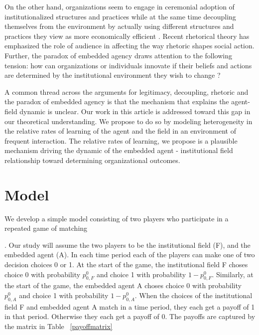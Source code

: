 \documentclass[12pt,letterpaper]{article}
\begin{document}
On the other hand, organizations seem to engage in ceremonial adoption of institutionalized structures and practices while at the same time decoupling themselves from the environment by actually using different structures and practices they view as more economically efficient \citep{Kostova2008}. Recent rhetorical theory has emphasized the role of audience in affecting the way rhetoric shapes social action. Further, the paradox of embedded agency draws attention  to the following tension: how can organizations or individuals innovate if their beliefs and actions are determined by the institutional environment they wish to change \citep{Scott1987}? 

A common thread across the arguments for legitimacy, decoupling, rhetoric and the paradox of embedded agency is that the mechanism that explains the agent-field dynamic is unclear. Our work in this article is addressed toward this gap in our  theoretical understanding. We propose to do so by modeling heterogeneity in the relative rates of learning  of the agent and the field in an environment of frequent interaction. The relative rates of learning, we propose is a plausible mechanism driving the dynamic of the embedded agent - institutional field relationship toward determining organizational outcomes.

\section{Model}

We develop a simple model consisting of two players who participate in a repeated game of matching . Our study will assume the two players to be the institutional field (F), and the embedded agent (A). In each time period each of the players can make one of two decision choices 0 or 1. At the start of the game, the institutional field F choses choice 0 with probability $p_{0,F}^0$ and choice 1 with probability $1 - p_{0,F}^0$. Similarly, at the start of the game, the embedded agent A choses choice 0 with probability $p_{0,A}^0$ and choice 1 with probability $1 - p_{0,A}^0$. When the choices of the institutional field F and embedded agent A match in a time period, they each get a payoff of 1 in that period. Otherwise they each get a payoff of 0. The payoffs are captured by the matrix in Table ~\ref{payoffmatrix}
\end{document}
